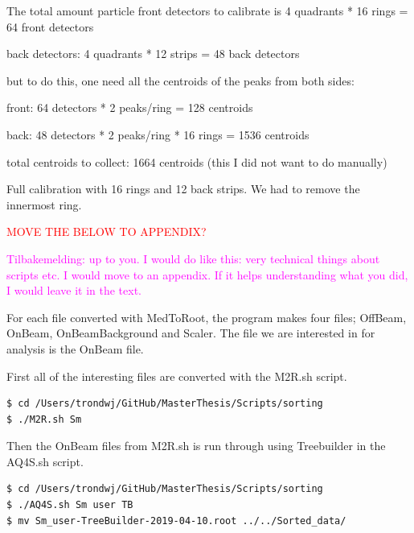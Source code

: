 \documentclass[twoside,english]{uiofysmaster/uiofysmaster}
\begin{document}
The total amount particle front detectors to calibrate is 4 quadrants * 16 rings = 64 front detectors 

back detectors: 4 quadrants * 12 strips = 48 back detectors


but to do this, one need all the centroids of the peaks from both sides:

front: 64 detectors * 2 peaks/ring = 128 centroids

back: 48 detectors * 2 peaks/ring * 16 rings =  1536 centroids 

total centroids to collect: 1664 centroids (this I did not want to do manually)

Full calibration with 16 rings and 12 back strips. We had to remove the innermost ring. 



\textcolor{red}{MOVE THE BELOW TO APPENDIX?}

\textcolor{Magenta}{Tilbakemelding: \newline 
up to you. I would do like this: \newline
very technical things about scripts etc. I would move to an appendix. If it helps understanding what you did, I would leave it in the text.
}

For each file converted with MedToRoot, the program makes four files; OffBeam, OnBeam, OnBeamBackground and Scaler. The file we are interested in for analysis is the OnBeam file. 

First all of the interesting files are converted with the M2R.sh script. 
\begin{lstlisting}[language=sh]
$ cd /Users/trondwj/GitHub/MasterThesis/Scripts/sorting 
$ ./M2R.sh Sm
\end{lstlisting}

Then the OnBeam files from M2R.sh is run through using Treebuilder in the AQ4S.sh script. 

\begin{lstlisting}[language=sh]
$ cd /Users/trondwj/GitHub/MasterThesis/Scripts/sorting 
$ ./AQ4S.sh Sm user TB
$ mv Sm_user-TreeBuilder-2019-04-10.root ../../Sorted_data/
\end{lstlisting}
\end{document}
